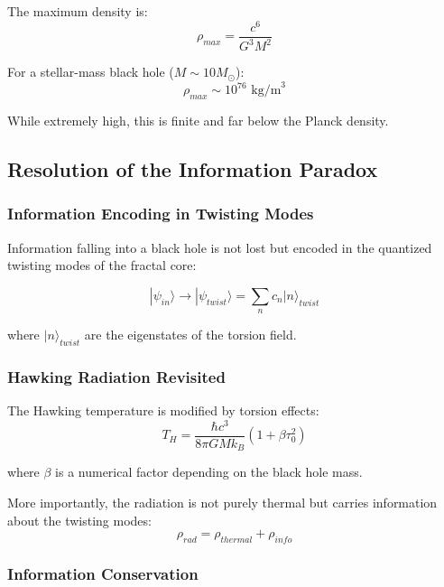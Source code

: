 The maximum density is:
\begin{equation}
    \rho_{max} = \frac{c^6}{G^3M^2}
\end{equation}

For a stellar-mass black hole ($M \sim 10M_\odot$):
\begin{equation}
    \rho_{max} \sim 10^{76} \text{ kg/m}^3
\end{equation}

While extremely high, this is finite and far below the Planck density.

\subsection{Resolution of the Information Paradox}

\subsubsection{Information Encoding in Twisting Modes}

Information falling into a black hole is not lost but encoded in the quantized twisting modes of the fractal core:

\begin{equation}
    |\psi_{in}\rangle \to |\psi_{twist}\rangle = \sum_n c_n |n\rangle_{twist}
\end{equation}

where $|n\rangle_{twist}$ are the eigenstates of the torsion field.

\subsubsection{Hawking Radiation Revisited}

The Hawking temperature is modified by torsion effects:
\begin{equation}
    T_H = \frac{\hbar c^3}{8\pi GMk_B}(1 + \beta\tau_0^2)
\end{equation}

where $\beta$ is a numerical factor depending on the black hole mass.

More importantly, the radiation is not purely thermal but carries information about the twisting modes:
\begin{equation}
    \rho_{rad} = \rho_{thermal} + \rho_{info}
\end{equation}

\subsubsection{Information Conservation}

